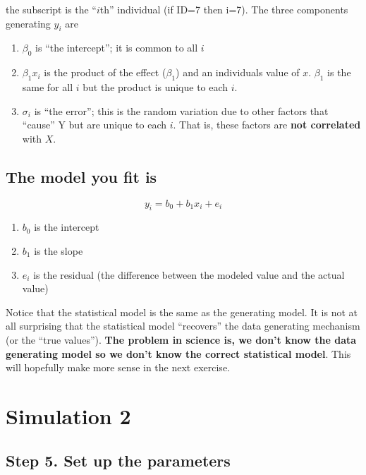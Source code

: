\documentclass[]{book}
\providecommand{\tightlist}{%
  \setlength{\itemsep}{0pt}\setlength{\parskip}{0pt}}
\begin{document}
the subscript is the ``\(i\)th'' individual (if ID=7 then i=7). The
three components generating \(y_i\) are

\begin{enumerate}
\def\labelenumi{\arabic{enumi}.}
\tightlist
\item
  \(\beta_0\) is ``the intercept''; it is common to all \(i\)
\item
  \(\beta_1 x_i\) is the product of the effect (\(\beta_1\)) and an
  individuals value of \(x\). \(\beta_1\) is the same for all \(i\) but
  the product is unique to each \(i\).
\item
  \(\sigma_i\) is ``the error''; this is the random variation due to
  other factors that ``cause'' Y but are unique to each \(i\). That is,
  these factors are \textbf{not correlated} with \(X\).
\end{enumerate}

\subsection{The model you fit is}\label{the-model-you-fit-is}

\begin{equation}
y_i = b_0 + b_1 x_i + e_i
\end{equation}

\begin{enumerate}
\def\labelenumi{\arabic{enumi}.}
\tightlist
\item
  \(b_0\) is the intercept
\item
  \(b_1\) is the slope
\item
  \(e_i\) is the residual (the difference between the modeled value and
  the actual value)
\end{enumerate}

Notice that the statistical model is the same as the generating model.
It is not at all surprising that the statistical model ``recovers'' the
data generating mechanism (or the ``true values''). \textbf{The problem
in science is, we don't know the data generating model so we don't know
the correct statistical model}. This will hopefully make more sense in
the next exercise.

\section{Simulation 2}\label{simulation-2}

\subsection{Step 5. Set up the
parameters}\label{step-5.-set-up-the-parameters}
\end{document}
